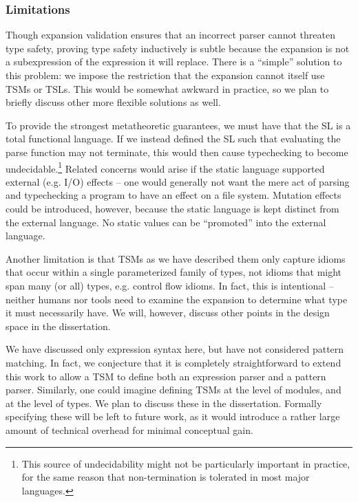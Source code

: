 \subsubsection{Limitations}\label{sec:tsms-limitations}
Though expansion validation ensures that an incorrect parser cannot threaten type safety,  proving type safety inductively is subtle because the expansion is not a subexpression of the expression it will replace. There is a ``simple'' solution to this problem: we impose the restriction that the expansion cannot itself use TSMs or TSLs. This would be somewhat awkward in practice, so we plan to briefly discuss other more flexible solutions as well.  

To provide the strongest metatheoretic guarantees, we must have that the SL is a total functional language. If we instead defined the SL such that evaluating the parse function may not terminate, this would then cause typechecking to become undecidable.\footnote{This source of undecidability might not be particularly important in practice, for the same reason that non-termination is tolerated in most major languages.} Related concerns would arise if the static language supported external (e.g. I/O) effects -- one would generally not want the mere act of parsing and typechecking a program to have an effect on a file system. Mutation effects could be introduced, however, because the static language is kept distinct from the external language. No static values can be ``promoted'' into the external language. 

Another limitation is that TSMs as we have described them only capture idioms that occur within a single parameterized family of types,  not idioms that might span many (or all) types, e.g. control flow idioms. In fact, this is intentional -- neither humans nor tools need to examine the expansion to determine what type it must necessarily have. We will, however, discuss other points in the design space in the dissertation.

We have discussed only expression syntax here, but have not considered pattern matching. In fact, we conjecture that it is completely straightforward to extend this work to allow a TSM to define both an expression parser and a pattern parser. Similarly, one could imagine defining TSMs at the level of modules, and at the level of types. We plan to discuss these in the dissertation. Formally specifying these will be left to future work, as it would introduce a rather large amount of technical overhead for minimal conceptual gain. %


